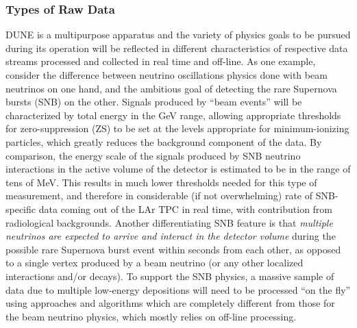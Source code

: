 \subsubsection{Types of Raw Data}
DUNE is a multipurpose apparatus and the variety of physics goals to be pursued during its operation
will be reflected in different characteristics of respective data streams processed and collected in real time and off-line.
As one example, consider the difference between neutrino oscillations physics done with beam neutrinos
on one hand, and the ambitious goal of detecting the rare Supernova bursts (SNB) on the other.
Signals produced by ``beam events'' will be characterized by total energy in the GeV range, allowing
appropriate thresholds for zero-suppression (ZS) to be set at the levels appropriate for
minimum-ionizing particles, which greatly reduces the
background component of the data. By comparison, the energy scale of the signals produced by
SNB neutrino interactions in the active volume of the detector is estimated to be in the range of tens
of MeV. This results in much lower thresholds needed for this type of measurement, and therefore
in considerable (if not overwhelming) rate of SNB-specific data coming
out of the LAr TPC in real time, with contribution from radiological backgrounds.
Another differentiating SNB feature is that \textit{multiple neutrinos are expected
to arrive and interact in the detector volume} during the possible rare Supernova burst event within seconds
from each other, as opposed to a single vertex produced by a beam neutrino (or any other localized
interactions and/or decays).
To support the SNB physics, a massive sample of data due to multiple low-energy
depositions will need to be processed ``on the fly''
using approaches and algorithms which are completely  different from those for the
beam neutrino physics, which mostly relies on off-line processing.


